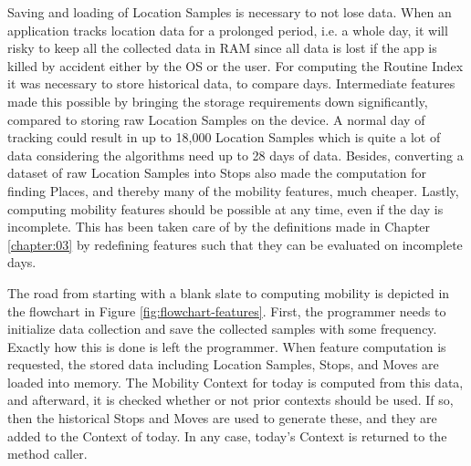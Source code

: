 Saving and loading of Location Samples is necessary to not lose data. When an application tracks location data for a prolonged period, i.e. a whole day, it will risky to keep all the collected data in RAM since all data is lost if the app is killed by accident either by the OS or the user. For computing the Routine Index it was necessary to store historical data, to compare days. Intermediate features made this possible by bringing the storage requirements down significantly, compared to storing raw Location Samples on the device. A normal day of tracking could result in up to 18,000 Location Samples which is quite a lot of data considering the algorithms need up to 28 days of data. Besides, converting a dataset of raw Location Samples into Stops also made the computation for finding Places, and thereby many of the mobility features, much cheaper. Lastly, computing mobility features should be possible at any time, even if the day is incomplete. This has been taken care of by the definitions made in Chapter \ref{chapter:03} by redefining features such that they can be evaluated on incomplete days. 

The road from starting with a blank slate to computing mobility is depicted in the flowchart in Figure \ref{fig:flowchart-features}. First, the programmer needs to initialize data collection and save the collected samples with some frequency. Exactly how this is done is left the programmer. When feature computation is requested, the stored data including Location Samples, Stops, and Moves are loaded into memory. The Mobility Context for today is computed from this data, and afterward, it is checked whether or not prior contexts should be used. If so, then the historical Stops and Moves are used to generate these, and they are added to the Context of today. In any case, today's Context is returned to the method caller.



